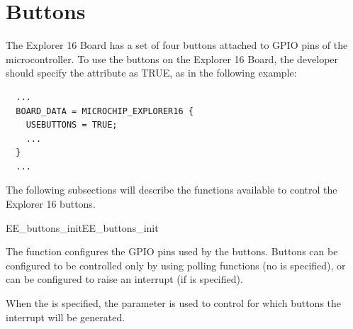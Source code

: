 
\section{Buttons}

The Explorer 16 Board has a set of four buttons attached to GPIO pins
of the microcontroller. To use the buttons on the Explorer 16 Board, the
developer should specify the  attribute as TRUE, as
in the following example:

\begin{lstlisting}
  ...
  BOARD_DATA = MICROCHIP_EXPLORER16 {
    USEBUTTONS = TRUE;
    ...
  }
  ...
\end{lstlisting}

The following subsections will describe the functions available to
control the Explorer 16 buttons.

\begin{function_nopb2}{EE\_buttons\_init}{EE_buttons_init}
  
  \begin{fundescription}
    The function configures the GPIO pins used by the buttons. Buttons
    can be configured to be controlled only by using polling functions
    (no  is specified), or can be configured to raise
    an interrupt (if  is specified).

    When the  is specified, the  parameter
    is used to control for which buttons the interrupt will be
    generated.
  \end{fundescription}
  
  \begin{funparameters}

  \end{funparameters}
  
  \begin{funreturn}
  \end{funreturn}
  
\end{function_nopb2}

